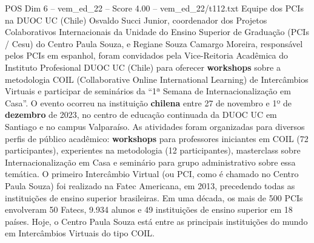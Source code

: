 \begin{textsample}{POS Dim 6 – vem\_ed\_22 – Score 4.00 – vem\_ed\_22/t112.txt}  \label{ex:f6_pos_045}
Equipe dos PCIs na DUOC UC (Chile) Osvaldo Succi Junior, coordenador dos Projetos Colaborativos Internacionais da Unidade do Ensino Superior de Graduação (PCIs / Cesu) do Centro Paula Souza, e Regiane Souza Camargo Moreira, responsável pelos PCIs em espanhol, foram convidados pela Vice-Reitoria Acadêmica do Instituto Profesional DUOC UC (Chile) para oferecer \textbf{workshops} sobre a metodologia COIL (Collaborative Online International Learning) de Intercâmbios Virtuais e participar de seminários da “1ª Semana de Internacionalização em Casa”.
O evento ocorreu na instituição \textbf{chilena} entre 27 de novembro e 1º de \textbf{dezembro} de 2023, no centro de educação continuada da DUOC UC em Santiago e no campus Valparaíso.
As atividades foram organizadas para diversos perfis de público acadêmico: \textbf{workshops} para professores iniciantes em COIL (72 participantes), experientes na metodologia (12 participantes), masterclass sobre Internacionalização em Casa e seminário para grupo administrativo sobre essa temática.
O primeiro Intercâmbio Virtual (ou PCI, como é chamado no Centro Paula Souza) foi realizado na Fatec Americana, em 2013, precedendo todas as instituições de ensino superior brasileiras.
Em uma década, os mais de 500 PCIs envolveram 50 Fatecs, 9.934 alunos e 49 instituições de ensino superior em 18 países.
Hoje, o Centro Paula Souza está entre as principais instituições do mundo em Intercâmbios Virtuais do tipo COIL.

\end{textsample}
